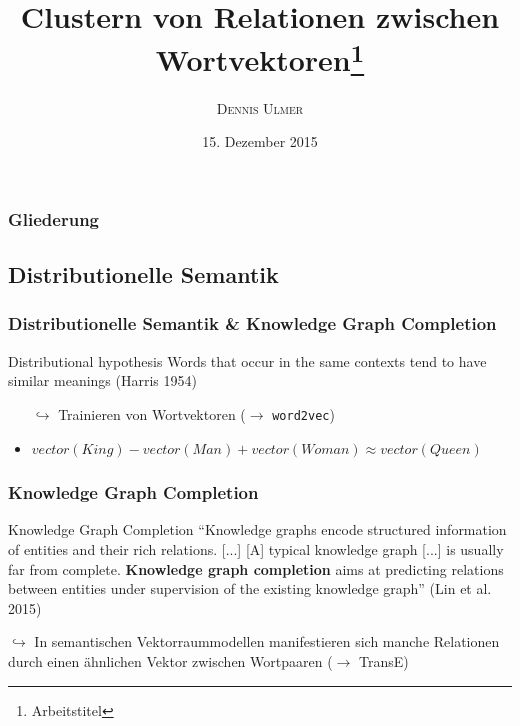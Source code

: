 \documentclass[10pt,xcolor={usenames,dvipsnames,svgnames,table}]{beamer}
\title[]{Clustern von Relationen zwischen Wortvektoren\footnote{Arbeitstitel}} %
\author{\textsc{Dennis Ulmer}} %
\institute[Institut für Computerlinguistik]{
	Computerlinguistisches Abschlusskolloquium\\
	Insitut für Computerlinguistik
} %
\date{15. Dezember 2015} %
\begin{document}
\begin{frame}
	\titlepage
\end{frame}

\begin{frame}
	\frametitle{Gliederung} %
	\setcounter{tocdepth}{2}
	\tableofcontents %
\end{frame}

\begin{frame}
	\section{Distributionelle Semantik}
	\frametitle{Distributionelle Semantik \& Knowledge Graph Completion} 
	\begin{block}{Distributional hypothesis}
		Words that occur in the same contexts tend to have similar meanings (Harris 1954)
	\end{block}
	\begin{itemize}
		\item[$\hookrightarrow$] Trainieren von Wortvektoren ($\rightarrow$ \texttt{word2vec})
		\item $vector(King) - vector(Man) + vector(Woman) \approx vector(Queen)$
	\end{itemize} 
\end{frame}

\begin{frame}
	\frametitle{Knowledge Graph Completion}
	\begin{block}{Knowledge Graph Completion}
		``Knowledge graphs encode structured information of entities and their rich relations. [...] [A] typical knowledge graph [...] is usually far from complete. \textbf{Knowledge graph completion} aims at predicting relations between entities under supervision of the existing knowledge graph'' (Lin et al. 2015)
	\end{block}
	$\hookrightarrow$ In semantischen Vektorraummodellen manifestieren sich manche Relationen durch einen ähnlichen Vektor zwischen Wortpaaren ($\rightarrow$ TransE)
\end{frame}
\end{document}
